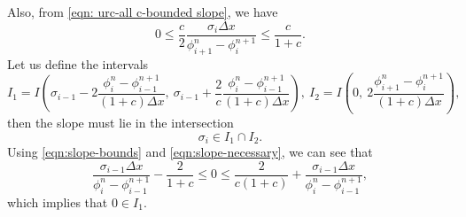 \documentclass[../thesis.tex]{subfiles}
\begin{document}
Also, from \eqref{eqn: urc-all c-bounded slope}, we have
\begin{equation}
    0
    \leq
    \frac{c}{2}
    \frac{\sigma_{i}\Delta x}
    {\phi_{i+1}^{n} - \phi_{i}^{n+1}}
    \leq
    \frac{c}{1+c}.
\end{equation}
Let us define the intervals
\begin{equation}
    I_{1}=I\left(
        \sigma_{i-1}
        -2\frac{\phi_{i}^{n} - \phi_{i-1}^{n+1}}
        {(1+c)\Delta x},
        ~\sigma_{i-1}
        +\frac{2}{c}
        \frac{\phi_{i}^{n} - \phi_{i-1}^{n+1}}
        {(1+c)\Delta x}
    \right),\
    I_{2} = I\left(
        0,
        ~2\frac{\phi_{i+1}^{n} - \phi_{i}^{n+1}}{(1+c)\Delta x}
    \right),
\end{equation}
then the slope must lie in the intersection
\begin{equation}
    \sigma_{i} \in I_{1} \cap I_{2}.
\end{equation}
Using \eqref{eqn:slope-bounds} and \eqref{eqn:slope-necessary}, we can see that
\begin{equation}
        \frac{\sigma_{i-1}\Delta x}
        {\phi_{i}^{n} - \phi_{i-1}^{n+1}}
        -\frac{2}{1+c}
        \leq
        0
        \leq
        \frac{2}{c(1+c)}
        + \frac{\sigma_{i-1}\Delta x}
        {\phi_{i}^{n} - \phi_{i-1}^{n+1}},
\end{equation}
which implies that \(0 \in I_{1}\).
\end{document}
